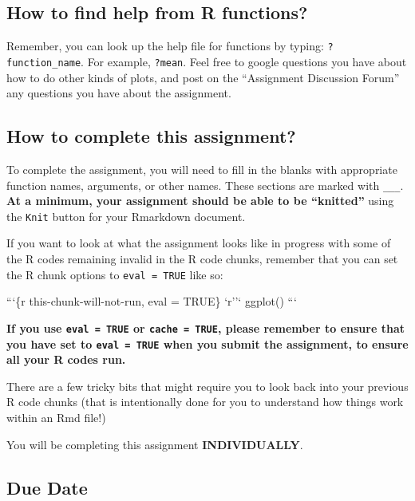 \documentclass[
]{article}
\newenvironment{Shaded}{\begin{snugshade}}{\end{snugshade}}
\newcommand{\BaseNTok}[1]{\textcolor[rgb]{0.00,0.00,0.81}{#1}}
\begin{document}
\hypertarget{how-to-find-help-from-r-functions}{%
\subsection{How to find help from R
functions?}\label{how-to-find-help-from-r-functions}}

Remember, you can look up the help file for functions by typing:
\texttt{?function\_name}. For example, \texttt{?mean}. Feel free to
google questions you have about how to do other kinds of plots, and post
on the ``Assignment Discussion Forum'' any questions you have about the
assignment.

\hypertarget{how-to-complete-this-assignment}{%
\subsection{How to complete this
assignment?}\label{how-to-complete-this-assignment}}

To complete the assignment, you will need to fill in the blanks with
appropriate function names, arguments, or other names. These sections
are marked with \texttt{\_\_\_}. \textbf{At a minimum, your assignment
should be able to be ``knitted''} using the \texttt{Knit} button for
your Rmarkdown document.

If you want to look at what the assignment looks like in progress with
some of the R codes remaining invalid in the R code chunks, remember
that you can set the R chunk options to \texttt{eval\ =\ TRUE} like so:

\begin{Shaded}
\begin{Highlighting}[]
\BaseNTok{```\{r this-chunk-will-not-run, eval = TRUE\} `r''`}
\BaseNTok{ggplot()}
\BaseNTok{```}
\end{Highlighting}
\end{Shaded}

\textbf{If you use \texttt{eval\ =\ TRUE} or \texttt{cache\ =\ TRUE},
please remember to ensure that you have set to \texttt{eval\ =\ TRUE}
when you submit the assignment, to ensure all your R codes run.}

There are a few tricky bits that might require you to look back into
your previous R code chunks (that is intentionally done for you to
understand how things work within an Rmd file!)

You will be completing this assignment \textbf{INDIVIDUALLY}.

\hypertarget{due-date}{%
\subsection{Due Date}\label{due-date}}
\end{document}
